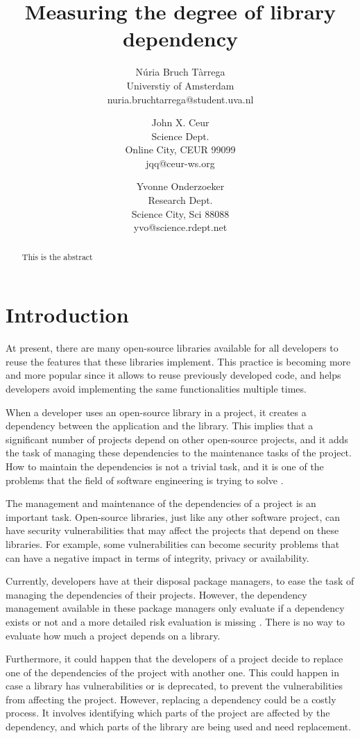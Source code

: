 \documentclass[a4paper]{article}
\title{Measuring the degree of library dependency}
\author{
Núria Bruch Tàrrega \\ Universtiy of Amsterdam \\ nuria.bruchtarrega@student.uva.nl
\and
John X. Ceur \\ Science Dept.\\
                Online City, CEUR 99099 \\ jqq@ceur-ws.org
\and
Yvonne Onderzoeker \\ Research Dept.\\
                Science City, Sci 88088 \\ yvo@science.rdept.net
}
\begin{document}
\maketitle

\begin{abstract}
This is the abstract
\end{abstract}


\section{Introduction}
At present, there are many open-source libraries available for all developers to reuse the features that these libraries implement. This practice is becoming more and more popular since it allows to reuse previously developed code, and helps developers avoid implementing the same functionalities multiple times.

When a developer uses an open-source library in a project, it creates a dependency between the application and the library. This implies that a significant number of projects depend on other open-source projects, and it adds the task of managing these dependencies to the maintenance tasks of the project. How to maintain the dependencies is not a trivial task, and it is one of the problems that the field of software engineering is trying to solve \cite{kula2014visualizing}.

The management and maintenance of the dependencies of a project is an important task. Open-source libraries, just like any other software project, can have security vulnerabilities that may affect the projects that depend on these libraries. For example, some vulnerabilities can become security problems that can have a negative impact in terms of integrity, privacy or availability.

Currently, developers have at their disposal package managers, to ease the task of managing the dependencies of their projects. However, the dependency management available in these package managers only evaluate if a dependency exists or not and a more detailed risk evaluation is missing \cite{hejderup2018prazi}. There is no way to evaluate how much a project depends on a library.

Furthermore, it could happen that the developers of a project decide to replace one of the dependencies of the project with another one. This could happen in case a library has vulnerabilities or is deprecated, to prevent the vulnerabilities from affecting the project. However, replacing a dependency could be a costly process. It involves identifying which parts of the project are affected by the dependency, and which parts of the library are being used and need replacement.
\end{document}

